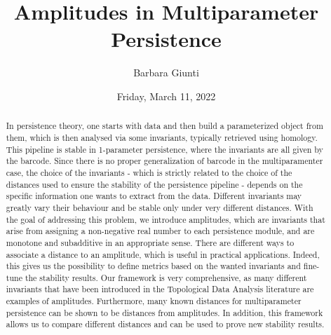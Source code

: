 \documentclass{UAmathtalk}
\author{Barbara Giunti}
\title{Amplitudes in Multiparameter Persistence}
\date{Friday, March 11, 2022}
\begin{document}
\maketitle

\begin{abstract}
In persistence theory, one starts with data and then build a parameterized object from them, which is then analysed via some invariants, typically retrieved using homology. This pipeline is stable in 1-parameter persistence, where the invariants are all given by the barcode. Since there is no proper generalization of barcode in the multiparamenter case, the choice of the invariants - which is strictly related to the choice of the distances used to ensure the stability of the persistence pipeline - depends on the specific information one wants to extract from the data. Different invariants may greatly vary their behaviour and be stable only under very different distances.
With the goal of addressing this problem, we introduce amplitudes, which are invariants that arise from assigning a non-negative real number to each persistence module, and are monotone and subadditive in an appropriate sense. There are different ways to associate a distance to an amplitude, which is useful in practical applications. Indeed, this gives us the possibility to define metrics based on the wanted invariants and fine-tune the stability results. Our framework is very comprehensive, as many different invariants that have been introduced in the Topological Data Analysis literature are examples of amplitudes. Furthermore, many known distances for multiparameter persistence can be shown to be distances from amplitudes. In addition, this framework allows us to compare different distances and can be used to prove new stability results.

\end{abstract}
\end{document}
